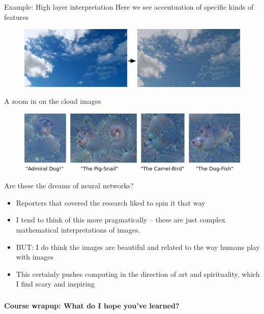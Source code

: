 \documentclass[mathserif, aspectratio=169]{beamer}
\begin{document}
\begin{frame}{Example: High layer interpretation}
Here we see accentuation of specific kinds of features
\begin{figure}
\includegraphics[width=\textwidth]{skyarrow_google}
\caption*{}
\end{figure}
\end{frame}

\begin{frame}{A zoom in on the cloud images}
\begin{figure}
\includegraphics[width=\textwidth]{funny-animals_google}
\caption*{}
\end{figure}

\vspace{-10mm}
\pause
Are these the dreams of neural networks?
\begin{itemize}
	\item Reporters that covered the research liked to spin it that way
	\item I tend to think of this more pragmatically -- these are just complex mathematical interpretations of images.
	\item BUT: I do think the images are beautiful and related to the way humans play with images
	\item This certainly pushes computing in the direction of art and spirituality, which I find scary and inspiring
\end{itemize}
\end{frame}

\begin{frame}[t]\frametitle{}
	\textbf{Course wrapup: What do I hope you've learned?}
\end{frame}
\end{document}
